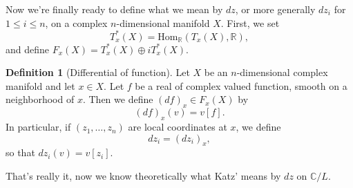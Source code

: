 \documentclass{article}
\theoremstyle{definition}
\newtheorem{defi}{Definition}
\begin{document}
Now we're finally ready to define what we mean by $dz$, or more generally $dz_i$ for $1\leq i\leq n$, on a complex $n$-dimensional manifold $X$. First, we set
\[T^\ast_x(X)=\mathrm{Hom}_\mathbb{R}(T_x(X),\mathbb{R}),\]
and define $F_x(X)=T^\ast_x(X)\oplus iT^\ast_x(X)$.

\begin{defi}[Differential of function]
  Let $X$ be an $n$-dimensional complex manifold and let $x\in X$. Let $f$ be a real of complex valued function, smooth on a neighborhood of $x$. Then we define $(df)_x\in F_x(X)$ by
  \[(df)_x(v)=v[f].\]
  In particular, if $(z_1,\dots,z_n)$ are local coordinates at $x$, we define
  \[dz_i=(dz_i)_x,\]
  so that $dz_i(v)=v[z_i]$.
\end{defi}
That's really it, now we know theoretically what Katz' means by $dz$ on $\mathbb{C}/L$.
\end{document}
